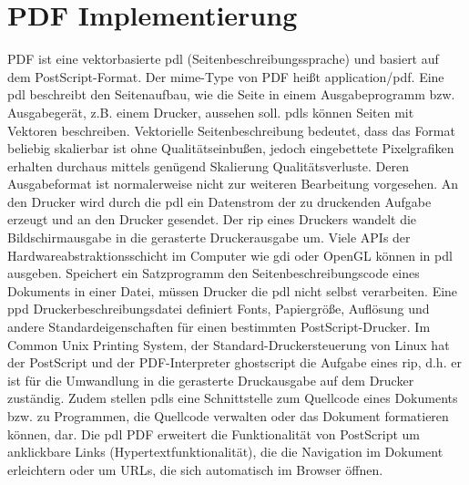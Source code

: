 \section{PDF Implementierung}
PDF ist eine vektorbasierte \gls{pdl} (Seitenbeschreibungssprache) und basiert auf dem PostScript-Format. Der \gls{mime}-Type von PDF heißt application/pdf. Eine \gls{pdl} beschreibt den Seitenaufbau, wie die Seite in einem Ausgabeprogramm bzw. Ausgabegerät, z.B. einem Drucker, aussehen soll. \gls{pdl}s können Seiten mit Vektoren beschreiben. Vektorielle Seitenbeschreibung bedeutet, dass das Format beliebig skalierbar ist ohne Qualitätseinbußen, jedoch eingebettete Pixelgrafiken erhalten durchaus mittels genügend Skalierung Qualitätsverluste. Deren Ausgabeformat ist normalerweise nicht zur weiteren Bearbeitung vorgesehen. An den Drucker wird durch die \gls{pdl} ein Datenstrom der zu druckenden Aufgabe erzeugt und an den Drucker gesendet. Der \gls{rip} eines Druckers wandelt die Bildschirmausgabe in die gerasterte Druckerausgabe um. Viele APIs der Hardwareabstraktionsschicht im Computer wie \gls{gdi} oder OpenGL können in \gls{pdl} ausgeben. Speichert ein Satzprogramm den Seitenbeschreibungscode eines Dokuments in einer Datei, müssen Drucker die \gls{pdl} nicht selbst verarbeiten. Eine \gls{ppd} Druckerbeschreibungsdatei definiert Fonts, Papiergröße, Auflösung und andere Standardeigenschaften für einen bestimmten PostScript-Drucker. \cite{ppd-file} Im Common Unix Printing System, der Standard-Druckersteuerung von Linux hat der PostScript und der PDF-Interpreter ghostscript die Aufgabe eines \gls{rip}, d.h. er ist für die Umwandlung in die gerasterte Druckausgabe auf dem Drucker zuständig. Zudem stellen \gls{pdl}s eine Schnittstelle zum Quellcode eines Dokuments bzw. zu Programmen, die Quellcode verwalten oder das Dokument formatieren können, dar. Die \gls{pdl} PDF erweitert die Funktionalität von PostScript um anklickbare Links (Hypertextfunktionalität), die die Navigation im Dokument erleichtern oder um URLs, die sich automatisch im Browser öffnen. \cite{wiki-pdl} 


